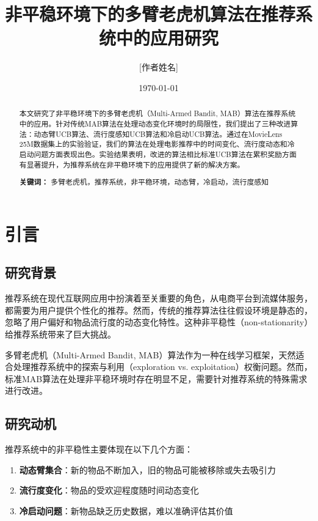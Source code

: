 \documentclass[12pt,a4paper]{article}
\title{非平稳环境下的多臂老虎机算法在推荐系统中的应用研究}
\author{[作者姓名]}
\date{\today}
\begin{document}
\maketitle

\begin{abstract}
本文研究了非平稳环境下的多臂老虎机（Multi-Armed Bandit, MAB）算法在推荐系统中的应用。针对传统MAB算法在处理动态变化环境时的局限性，我们提出了三种改进算法：动态臂UCB算法、流行度感知UCB算法和冷启动UCB算法。通过在MovieLens 25M数据集上的实验验证，我们的算法在处理电影推荐中的时间变化、流行度动态和冷启动问题方面表现出色。实验结果表明，改进的算法相比标准UCB算法在累积奖励方面有显著提升，为推荐系统在非平稳环境下的应用提供了新的解决方案。

\vspace{0.5cm}
\noindent\textbf{关键词：} 多臂老虎机，推荐系统，非平稳环境，动态臂，冷启动，流行度感知
\end{abstract}

\section{引言}

\subsection{研究背景}

推荐系统在现代互联网应用中扮演着至关重要的角色，从电商平台到流媒体服务，都需要为用户提供个性化的推荐。然而，传统的推荐算法往往假设环境是静态的，忽略了用户偏好和物品流行度的动态变化特性。这种非平稳性（non-stationarity）给推荐系统带来了巨大挑战。

多臂老虎机（Multi-Armed Bandit, MAB）算法作为一种在线学习框架，天然适合处理推荐系统中的探索与利用（exploration vs. exploitation）权衡问题。然而，标准MAB算法在处理非平稳环境时存在明显不足，需要针对推荐系统的特殊需求进行改进。

\subsection{研究动机}

推荐系统中的非平稳性主要体现在以下几个方面：

\begin{enumerate}
    \item \textbf{动态臂集合}：新的物品不断加入，旧的物品可能被移除或失去吸引力
    \item \textbf{流行度变化}：物品的受欢迎程度随时间动态变化
    \item \textbf{冷启动问题}：新物品缺乏历史数据，难以准确评估其价值
\end{enumerate}
\end{document}
